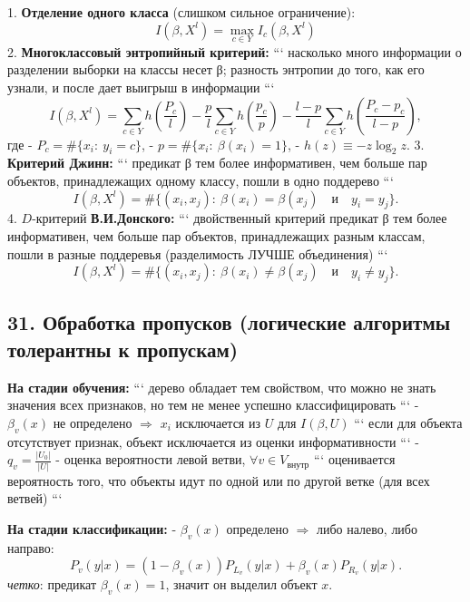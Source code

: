1. \textbf{Отделение одного класса} (слишком сильное ограничение):
$$I{\left( \beta, X^l \right)} = \max_{c \in Y}{I_c}{\left( \beta, X^l \right)}$$
2. \textbf{Многоклассовый энтропийный критерий:}
```
насколько много информации о разделении выборки на классы несет β;
разность энтропии до того, как его узнали, и после дает выигрыш в информации
```
$$
I{\left( \beta, X^l \right)} =
\sum_{c \in Y}{h{\left( \frac{P_c}{l} \right)}} -
\frac{p}{l} \sum_{c \in Y}{h{\left( \frac{p_c}{p} \right)}} -
\frac{l-p}{l} \sum_{c \in Y}{h{\left( \frac{P_c - p_c}{l - p} \right)}},
$$
где
- $P_c = \#{\lbrace x_i \! : \: y_i = c \rbrace}$,
- $p = \#{\lbrace x_i \! : \: \beta{(x_i)} = 1 \rbrace}$,
- $h{(z)} \equiv -z \log_2{z}$.
3. \textbf{Критерий Джинн:}
```
предикат β тем более информативен, чем больше пар объектов, принадлежащих
одному классу, пошли в одно поддерево
```
$$I{\left( \beta, X^l \right)} = \#{\lbrace {\left( x_i, x_j \right)} \! : \: \beta{\left( x_i \right)} = \beta{\left( x_j \right)} \quad \text{и} \quad y_i=y_j \rbrace}.$$
4. $D\textbf{-критерий}$ \textbf{В.И.Донского:}
```
двойственный критерий предикат β тем более информативен, чем больше пар
объектов, принадлежащих разным классам, пошли в разные поддеревья
(разделимость ЛУЧШЕ объединения)
```
$$I{\left( \beta, X^l \right)} = \#{\lbrace {\left( x_i, x_j \right)} \! : \: \beta{\left( x_i \right)} \neq \beta{\left( x_j \right)} \quad \text{и} \quad y_i \neq y_j \rbrace}.$$

\subsection{31. Обработка пропусков (логические алгоритмы толерантны к пропускам)}

\textbf{На стадии обучения:}
```
дерево обладает тем свойством, что можно не знать значения всех признаков,
но тем не менее успешно классифицировать
```
- $\beta_v{(x)}$ не определено $\Rightarrow$ $x_i$ исключается из $U$ для
$I{\left( \beta, U \right)}$
```
если для объекта отсутствует признак, объект исключается из оценки
информативности
```
- $\displaystyle q_v = \frac{|U_0|}{|U|}$ - оценка вероятности левой ветви,
$\forall v \in V_{\text{внутр}}$
```
оценивается вероятность того, что объекты идут по одной или по другой ветке
(для всех ветвей)
```

\textbf{На стадии классификации:}
- $\beta_v{(x)}$ определено $\Rightarrow$ либо налево, либо направо:
$$\displaystyle P_v{(y|x)} = {\left( 1 - \beta_v{(x)} \right)} P_{L_v}{\left( y|x \right)} + \beta_v{\left( x \right)} P_{R_v}{\left( y|x \right)}.$$
\textit{четко}: предикат $\beta_v{(x)}=1$, значит он выделил объект $x$.

